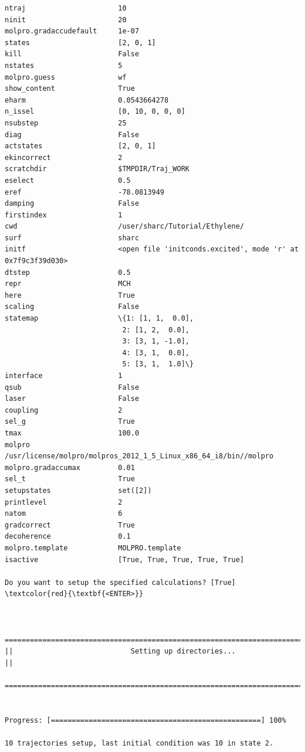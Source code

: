 \documentclass[a4paper,11pt,DIV=15,openany]{scrbook}
\begin{document}
\begin{oframed}
\begin{Verbatim}[commandchars=\\\{\}]
ntraj                      10
ninit                      20
molpro.gradaccudefault     1e-07
states                     [2, 0, 1]
kill                       False
nstates                    5
molpro.guess               wf
show_content               True
eharm                      0.0543664278
n_issel                    [0, 10, 0, 0, 0]
nsubstep                   25
diag                       False
actstates                  [2, 0, 1]
ekincorrect                2
scratchdir                 $TMPDIR/Traj_WORK
eselect                    0.5
eref                       -78.0813949
damping                    False
firstindex                 1
cwd                        /user/sharc/Tutorial/Ethylene/
surf                       sharc
initf                      <open file 'initconds.excited', mode 'r' at 0x7f9c3f39d030>
dtstep                     0.5
repr                       MCH
here                       True
scaling                    False
statemap                   \{1: [1, 1,  0.0], 
                            2: [1, 2,  0.0], 
                            3: [3, 1, -1.0], 
                            4: [3, 1,  0.0], 
                            5: [3, 1,  1.0]\}
interface                  1
qsub                       False
laser                      False
coupling                   2
sel_g                      True
tmax                       100.0
molpro                     /usr/license/molpro/molpros_2012_1_5_Linux_x86_64_i8/bin//molpro
molpro.gradaccumax         0.01
sel_t                      True
setupstates                set([2])
printlevel                 2
natom                      6
gradcorrect                True
decoherence                0.1
molpro.template            MOLPRO.template
isactive                   [True, True, True, True, True]

Do you want to setup the specified calculations? [True] \textcolor{red}{\textbf{<ENTER>}}


  ================================================================================
||                            Setting up directories...                           ||
  ================================================================================


Progress: [==================================================] 100%

10 trajectories setup, last initial condition was 10 in state 2.
\end{Verbatim}
\end{oframed}

\normalsize
\end{document}

